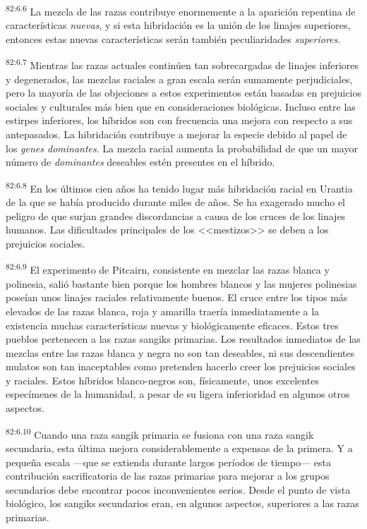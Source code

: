 \par
\textsuperscript{82:6.6} La mezcla de las razas contribuye enormemente a la aparición repentina de características \textit{nuevas}, y si esta hibridación es la unión de los linajes superiores, entonces estas nuevas características serán también peculiaridades \textit{superiores}.

\par
\textsuperscript{82:6.7} Mientras las razas actuales continúen tan sobrecargadas de linajes inferiores y degenerados, las mezclas raciales a gran escala serán sumamente perjudiciales, pero la mayoría de las objeciones a estos experimentos están basadas en prejuicios sociales y culturales más bien que en consideraciones biológicas. Incluso entre las estirpes inferiores, los híbridos son con frecuencia una mejora con respecto a sus antepasados. La hibridación contribuye a mejorar la especie debido al papel de los \textit{genes dominantes}. La mezcla racial aumenta la probabilidad de que un mayor número de \textit{dominantes} deseables estén presentes en el híbrido.

\par
\textsuperscript{82:6.8} En los últimos cien años ha tenido lugar más hibridación racial en Urantia de la que se había producido durante miles de años. Se ha exagerado mucho el peligro de que surjan grandes discordancias a causa de los cruces de los linajes humanos. Las dificultades principales de los <<mestizos>> se deben a los prejuicios sociales.

\par
\textsuperscript{82:6.9} El experimento de Pitcairn, consistente en mezclar las razas blanca y polinesia, salió bastante bien porque los hombres blancos y las mujeres polinesias poseían unos linajes raciales relativamente buenos. El cruce entre los tipos más elevados de las razas blanca, roja y amarilla traería inmediatamente a la existencia muchas características nuevas y biológicamente eficaces. Estos tres pueblos pertenecen a las razas sangiks primarias. Los resultados inmediatos de las mezclas entre las razas blanca y negra no son tan deseables, ni sus descendientes mulatos son tan inaceptables como pretenden hacerlo creer los prejuicios sociales y raciales. Estos híbridos blanco-negros son, físicamente, unos excelentes especímenes de la humanidad, a pesar de su ligera inferioridad en algunos otros aspectos.

\par
\textsuperscript{82:6.10} Cuando una raza sangik primaria se fusiona con una raza sangik secundaria, esta última mejora considerablemente a expensas de la primera. Y a pequeña escala ---que se extienda durante largos períodos de tiempo--- esta contribución sacrificatoria de las razas primarias para mejorar a los grupos secundarios debe encontrar pocos inconvenientes serios. Desde el punto de vista biológico, los sangiks secundarios eran, en algunos aspectos, superiores a las razas primarias.

